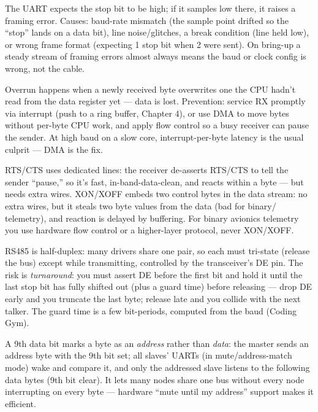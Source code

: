 The UART expects the stop bit to be high; if it samples low there, it raises a
framing error. Causes: baud-rate mismatch (the sample point drifted so the
``stop'' lands on a data bit), line noise/glitches, a break condition (line
held low), or wrong frame format (expecting 1 stop bit when 2 were sent).
On bring-up a steady stream of framing errors almost always means the baud or
clock config is wrong, not the cable.

Overrun happens when a newly received byte overwrites one the CPU hadn't read
from the data register yet --- data is lost. Prevention: service RX promptly
via interrupt (push to a ring buffer, Chapter 4), or use DMA to move bytes
without per-byte CPU work, and apply flow control so a busy receiver can pause
the sender. At high baud on a slow core, interrupt-per-byte latency is the
usual culprit --- DMA is the fix.

RTS/CTS uses dedicated lines: the receiver de-asserts RTS/CTS to tell the
sender ``pause,'' so it's fast, in-band-data-clean, and reacts within a byte ---
but needs extra wires. XON/XOFF embeds two control bytes in the data stream:
no extra wires, but it steals two byte values from the data (bad for binary/
telemetry), and reaction is delayed by buffering. For binary avionics
telemetry you use hardware flow control or a higher-layer protocol, never
XON/XOFF.

RS485 is half-duplex: many drivers share one pair, so each must tri-state
(release the bus) except while transmitting, controlled by the transceiver's DE
pin. The risk is \emph{turnaround}: you must assert DE before the first bit and
hold it until the last stop bit has fully shifted out (plus a guard time)
before releasing --- drop DE early and you truncate the last byte; release late
and you collide with the next talker. The guard time is a few bit-periods,
computed from the baud (Coding Gym).

A 9th data bit marks a byte as an \emph{address} rather than \emph{data}:
the master sends an address byte with the 9th bit set; all slaves' UARTs (in
mute/address-match mode) wake and compare it, and only the addressed slave
listens to the following data bytes (9th bit clear). It lets many nodes share
one bus without every node interrupting on every byte --- hardware
``mute until my address'' support makes it efficient.

